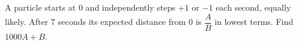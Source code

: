 A particle starts at 0 and independently steps $+1$ or $-1$ each second, equally likely. After 7 seconds its expected distance from 0 is $\dfrac{A}{B}$ in lowest terms. Find $1000A+B$.

